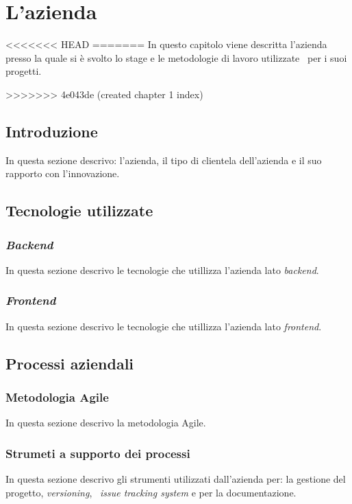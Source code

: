 
\chapter{L'azienda}
\label{cap:azienda}
<<<<<<< HEAD
=======
In questo capitolo viene descritta l’azienda presso la quale si è svolto lo stage e le metodologie di lavoro utilizzate \
per i suoi progetti.

>>>>>>> 4e043de (created chapter 1 index)
\section{Introduzione}
In questa sezione descrivo: l'azienda, il tipo di clientela dell'azienda e il suo rapporto con l'innovazione.

\section{Tecnologie utilizzate}

\subsection{\emph{Backend}}
In questa sezione descrivo le tecnologie che utillizza l'azienda lato \emph{backend}.

\subsection{\emph{Frontend}}
In questa sezione descrivo le tecnologie che utillizza l'azienda lato \emph{frontend}.

\section{Processi aziendali}

\subsection{Metodologia Agile}
In questa sezione descrivo la metodologia Agile.

\subsection{Strumeti a supporto dei processi}
In questa sezione descrivo gli strumenti utilizzati dall'azienda per: la gestione del progetto, \emph{versioning}, \
\emph{issue tracking system} e per la documentazione.

